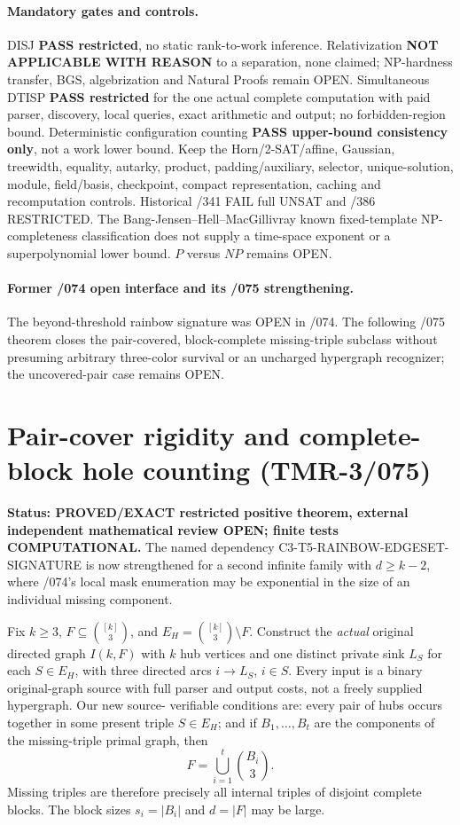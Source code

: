 \documentclass[11pt]{article}
\begin{document}
\paragraph{Mandatory gates and controls.}
DISJ \textbf{PASS restricted}, no static rank-to-work
inference. Relativization \textbf{NOT APPLICABLE WITH REASON}
to a separation, none claimed; NP-hardness transfer,
BGS, algebrization and Natural Proofs remain OPEN.
Simultaneous DTISP \textbf{PASS restricted} for the
one actual complete computation with paid parser,
discovery, local queries, exact arithmetic and output;
no forbidden-region bound. Deterministic configuration
counting \textbf{PASS upper-bound consistency only},
not a work lower bound. Keep the Horn/2-SAT/affine,
Gaussian, treewidth, equality, autarky, product,
padding/auxiliary, selector, unique-solution, module,
field/basis, checkpoint, compact representation,
caching and recomputation controls.
Historical /341 FAIL full UNSAT and /386 RESTRICTED.
The Bang-Jensen--Hell--MacGillivray known fixed-template
NP-completeness classification does not supply a
time-space exponent or a superpolynomial lower bound.
$P$ versus $NP$ remains OPEN.

\paragraph{Former /074 open interface and its /075 strengthening.}
The beyond-threshold rainbow signature was OPEN in /074.
The following /075 theorem closes the pair-covered,
block-complete missing-triple subclass without presuming
arbitrary three-color survival or an uncharged
hypergraph recognizer; the uncovered-pair case remains OPEN.



\clearpage
\section{Pair-cover rigidity and complete-block hole counting (TMR-3/075)}
\noindent\textbf{Status: PROVED/EXACT restricted positive theorem,
external independent mathematical review OPEN; finite tests
COMPUTATIONAL.}
The named dependency \textsf{C3-T5-RAINBOW-EDGESET-SIGNATURE}
is now strengthened for a second infinite family with
$d\ge k-2$, where /074's local mask enumeration may be
exponential in the size of an individual missing component.

Fix $k\ge3$, $F\subseteq\binom{[k]}3$, and
$E_H=\binom{[k]}3\setminus F$. Construct the \emph{actual}
original directed graph $I(k,F)$ with $k$ hub vertices and
one distinct private sink $L_S$ for each $S\in E_H$, with
three directed arcs $i\to L_S$, $i\in S$. Every input is
a binary original-graph source with full parser and output
costs, not a freely supplied hypergraph. Our new source-
verifiable conditions are: every pair of hubs occurs
together in some present triple $S\in E_H$; and if
$B_1,\ldots,B_t$ are the components of the missing-triple
primal graph, then
\[
  F=\bigcup_{i=1}^t\binom{B_i}{3}.
\]
Missing triples are therefore precisely all internal triples
of disjoint complete blocks. The block sizes $s_i=|B_i|$
and $d=|F|$ may be large.
\end{document}
